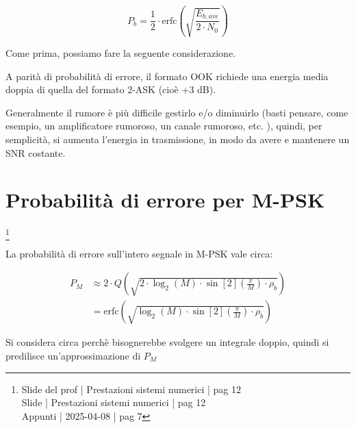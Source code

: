 {
    \Large 
    \begin{equation}
        P_b 
        = 
        \frac{1}{2}
            \cdot 
            \text{erfc}
            \left(
                \sqrt{
                    \frac{E_{b, ave}}{2 \cdot N_0}
                }
            \right)
    \end{equation}
}

Come prima, possiamo fare la seguente considerazione. \newline 

A parità di probabilità di errore, il formato OOK richiede una energia media doppia di quella del formato 2-ASK (cioè +3 dB). \newline 

\begin{tcolorbox}
    Generalmente il rumore è più difficile gestirlo e/o diminuirlo 
    (basti pensare, come esempio, un amplificatore rumoroso, un canale rumoroso, etc. ), 
    quindi, per semplicità, si aumenta l'energia in trasmissione, in modo da avere e mantenere un SNR costante.
\end{tcolorbox}

\newpage 

\section{Probabilità di errore per M-PSK}
\footnote{Slide del prof | Prestazioni sistemi numerici | pag 12 \\
Slide | Prestazioni sistemi numerici | pag 12 \\
Appunti | 2025-04-08 | pag 7
}

La probabilità di errore sull'intero segnale in M-PSK vale circa: 

{
    \Large 
    \begin{equation}
        \begin{split}
            P_M 
            &\approx
            2 \cdot Q 
            \left(
                \sqrt{
                    2 \cdot \log_{2} (M) \cdot \sin[2](\frac{\pi}{M}) \cdot \rho_b
                }
            \right)
            \\
            &= 
            \text{erfc} 
            \left(
                \sqrt{
                    \log_{2} (M) \cdot \sin[2](\frac{\pi}{M}) \cdot \rho_b
                }
            \right)
        \end{split}
    \end{equation}
}

\begin{tcolorbox}
    Si considera circa perchè bisognerebbe svolgere un integrale doppio, 
    quindi si predilisce un'approssimazione di $P_M$
\end{tcolorbox}

